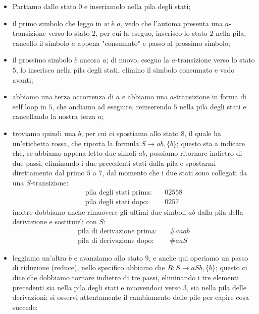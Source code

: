 \documentclass[class=book, crop=false, oneside, 12pt]{standalone}
\begin{document}
\begin{itemize}
    \item Partiamo dallo stato \(0\) e inseriamolo nella pila degli stati;
    \item il primo simbolo che leggo in \(w\) è \(a\), vedo che l'automa presenta una \(a\)-transizione verso lo stato \(2\), per cui la eseguo, inserisco lo stato \(2\) nella pila, cancello il simbolo \(a\) appena "consumato" e passo al prossimo simbolo;
    \item il prossimo simbolo è ancora \(a\); di nuovo, eseguo la \(a\)-transizione verso lo stato \(5\), lo inserisco nella pila degli stati, elimino il simbolo consumato e vado avanti;
    \item abbiamo una terza occorrenza di \(a\) e abbiamo una \(a\)-transizione in forma di self loop in \(5\), che andiamo ad eseguire, reinserendo \(5\) nella pila degli stati e cancellando la nostra terza \(a\);
    \item troviamo quindi una \(b\), per cui ci spostiamo allo stato \(8\), il quale ha un'etichetta rossa, che riporta la formula \(S \to ab, \{b\}\); questo sta a indicare che, se abbiamo appena letto due simoli \(ab\), possiamo ritornare indietro di due passi, eliminando i due precedenti stati dalla pila e spostarmi direttamento dal primo \(5\) a \(7\), dal momento che i due stati sono collegati da una \(S\)-transizione:
    \begin{align*}
        \textrm{pila degli stati prima:} &\quad 02558 \\
        \textrm{pila degli stati dopo:} &\quad 0257 
    \end{align*}
    inoltre dobbiamo anche rimuovere gli ultimi due simboli \(ab\) dalla pila della derivazione e sostituirli con \(S\):
    \begin{align*}
        \textrm{pila di derivazione prima:} &\quad \#aaab \\
        \textrm{pila di derivazione dopo:} &\quad \#aaS 
    \end{align*}
    \item leggiamo un'altra \(b\) e avanziamo allo stato \(9\), e anche qui operiamo un passo di riduzione (reduce), nello specifico abbiamo che \(R: S \to aSb, \{b\}\); questo ci dice che dobbiamo tornare indietro di tre passi, eliminando i tre elementi precedenti sia nella pila degli stati e muovendoci verso \(3\), sia nella pila delle derivazioni; si osservi attentamente il cambiamento delle pile per capire cosa succede:
    \begin{align*}

\end{align*}
\end{itemize}
\end{document}
